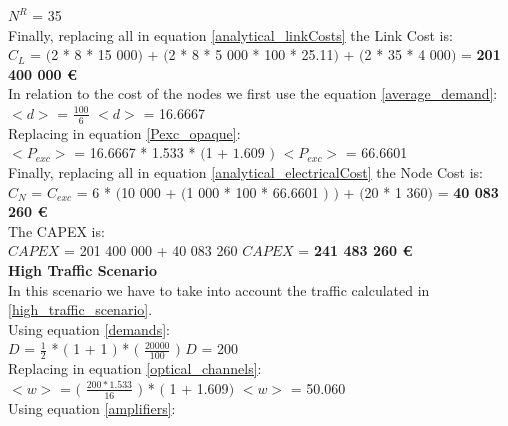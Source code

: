 $N^R$ = 35\\

Finally, replacing all in equation \ref{analytical_linkCosts} the Link Cost is:\\

$C_L$ = $($2 * 8 * 15 000$)$ + $($2 * 8 * 5 000 * 100 * 25.11$)$ + $($2 * 35 * 4 000$)$ = \textbf{201 400 000 \euro}\\

In relation to the cost of the nodes we first use the equation \ref{average_demand}:\\

$<d>$ = $\frac{100}{6}$ \qquad \qquad $<d>$ = 16.6667\\

Replacing in equation \ref{Pexc_opaque}:\\

$<P_{exc}>$ = 16.6667 * 1.533 * $($1 + $1.609$ $)$ \qquad \qquad $<P_{exc}>$ = 66.6601 \\

Finally, replacing all in equation \ref{analytical_electricalCost} the Node Cost is:\\

$C_N$ = $C_{exc}$ = 6 * $($10 000 + $($1 000 * 100 * 66.6601 $)$ $)$ + $($20 * 1 360$)$ = \textbf{40 083 260 \euro}\\

The CAPEX is:\\

$CAPEX$ = 201 400 000 + 40 083 260 \qquad \qquad $CAPEX$ = \textbf{241 483 260 \euro}\\

\textbf{High Traffic Scenario}\\

In this scenario we have to take into account the traffic calculated in \ref{high_traffic_scenario}.\\

Using equation \ref{demands}:\\

$D$ = $\frac{1}{2}$ * $($ 1 + 1 $)$ * $($ $\frac{20000}{100}$ $)$ \qquad \qquad $D$ = 200\\

Replacing in equation \ref{optical_channels}:\\

$<w>$ = $($ $\frac{200 * 1.533}{16}$ $)$ * $($ 1 + 1.609$)$ \qquad \qquad $<w>$ = 50.060\\

Using equation \ref{amplifiers}:\\

